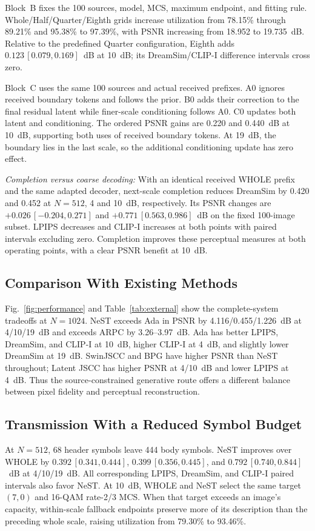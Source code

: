 Block~B fixes the 100 sources, model, MCS, maximum endpoint, and fitting rule. Whole/Half/Quarter/Eighth grids increase utilization from 78.15\% through 89.21\% and 95.38\% to 97.39\%, with PSNR increasing from 18.952 to 19.735~dB. Relative to the predefined Quarter configuration, Eighth adds $0.123\,[0.079,0.169]$~dB at 10~dB; its DreamSim/CLIP-I difference intervals cross zero.

Block~C uses the same 100 sources and actual received prefixes. A0 ignores received boundary tokens and follows the prior. B0 adds their correction to the final residual latent while finer-scale conditioning follows A0. C0 updates both latent and conditioning. The ordered PSNR gains are 0.220 and 0.440~dB at 10~dB, supporting both uses of received boundary tokens. At 19~dB, the boundary lies in the last scale, so the additional conditioning update has zero effect.

\emph{Completion versus coarse decoding:} With an identical received WHOLE prefix and the same adapted decoder, next-scale completion reduces DreamSim by 0.420 and 0.452 at $N=512$, 4 and 10~dB, respectively. Its PSNR changes are $+0.026\,[-0.204,0.271]$ and $+0.771\,[0.563,0.986]$~dB on the fixed 100-image subset. LPIPS decreases and CLIP-I increases at both points with paired intervals excluding zero. Completion improves these perceptual measures at both operating points, with a clear PSNR benefit at 10~dB.

\subsection{Comparison With Existing Methods}

Fig.~\ref{fig:performance} and Table~\ref{tab:external} show the complete-system tradeoffs at $N=1024$. NeST exceeds Ada in PSNR by 4.116/0.455/1.226~dB at 4/10/19~dB and exceeds ARPC by 3.26--3.97~dB. Ada has better LPIPS, DreamSim, and CLIP-I at 10~dB, higher CLIP-I at 4~dB, and slightly lower DreamSim at 19~dB. SwinJSCC and BPG have higher PSNR than NeST throughout; Latent JSCC has higher PSNR at 4/10~dB and lower LPIPS at 4~dB. Thus the source-constrained generative route offers a different balance between pixel fidelity and perceptual reconstruction.

\subsection{Transmission With a Reduced Symbol Budget}
\ifCLASSOPTIONonecolumn\fi

At $N=512$, 68 header symbols leave 444 body symbols. NeST improves over WHOLE by $0.392\,[0.341,0.444]$, $0.399\,[0.356,0.445]$, and $0.792\,[0.740,0.844]$~dB at 4/10/19~dB. All corresponding LPIPS, DreamSim, and CLIP-I paired intervals also favor NeST. At 10~dB, WHOLE and NeST select the same target $(7,0)$ and 16-QAM rate-2/3 MCS. When that target exceeds an image's capacity, within-scale fallback endpoints preserve more of its description than the preceding whole scale, raising utilization from 79.30\% to 93.46\%.

